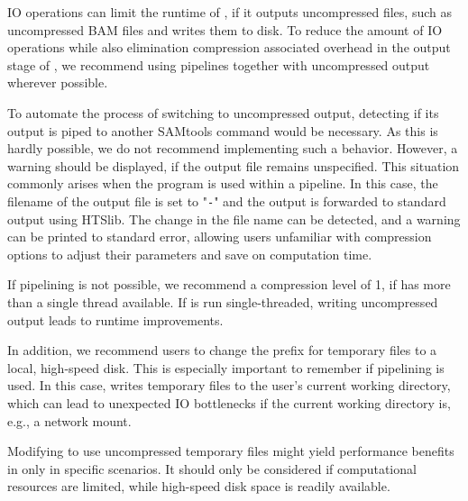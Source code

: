 IO operations can limit the runtime of \sort, if it outputs uncompressed files, such as uncompressed BAM files and writes them to disk.
To reduce the amount of IO operations while also elimination compression associated overhead in the output stage of \sort, we recommend using pipelines together with uncompressed output wherever possible.

To automate the process of \sort switching to uncompressed output, detecting if its output is piped to another SAMtools command would be necessary. As this is hardly possible, we do not recommend implementing such a behavior. However, a warning should be displayed, if the output file remains unspecified. This situation commonly arises when the program is used within a pipeline. In this case, the filename of the output file is set to "\texttt{-}" and the output is forwarded to standard output using HTSlib. The change in the file name can be detected, and a warning can be printed to standard error, allowing users unfamiliar with compression options to adjust their parameters and save on computation time.

If pipelining is not possible, we recommend a compression level of 1, if \sort has more than a single thread available. If \sort is run single-threaded, writing uncompressed output leads to runtime improvements.

In addition, we recommend users to change the prefix for temporary files to a local, high-speed disk. This is especially important to remember if pipelining is used. In this case, \sort writes temporary files to the user's current working directory, which can lead to unexpected IO bottlenecks if the current working directory is, e.g., a network mount.

Modifying \sort to use uncompressed temporary files might yield performance benefits in only in specific scenarios. It should only be considered if computational resources are limited, while high-speed disk space is readily available.
